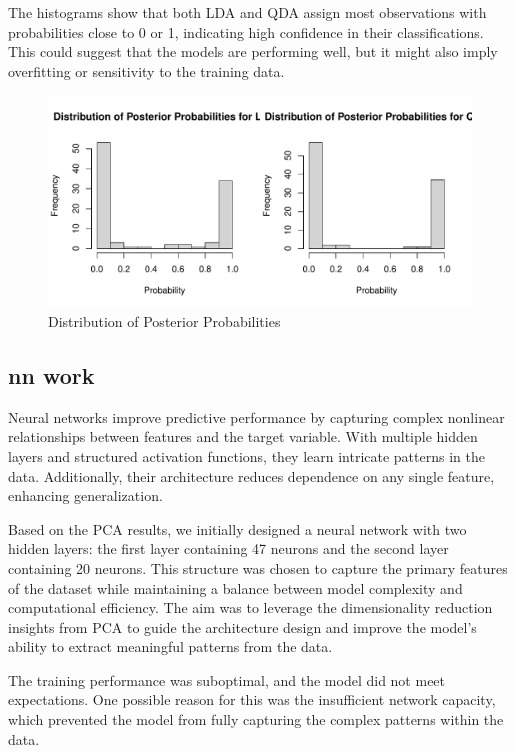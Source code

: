 \documentclass[
  12pt,
  letterpaper,
  DIV=11,
  numbers=noendperiod]{scrartcl}
\begin{document}
The histograms show that both LDA and QDA assign most observations with
probabilities close to 0 or 1, indicating high confidence in their
classifications. This could suggest that the models are performing well,
but it might also imply overfitting or sensitivity to the training data.

\begin{figure}[H]

{\centering \includegraphics{me_files/figure-pdf/Distribution of Posterior-1.pdf}

}

\caption{Distribution of Posterior Probabilities}

\end{figure}%

\subsection{nn work}\label{nn-work}

Neural networks improve predictive performance by capturing complex
nonlinear relationships between features and the target variable. With
multiple hidden layers and structured activation functions, they learn
intricate patterns in the data. Additionally, their architecture reduces
dependence on any single feature, enhancing generalization.

Based on the PCA results, we initially designed a neural network with
two hidden layers: the first layer containing 47 neurons and the second
layer containing 20 neurons. This structure was chosen to capture the
primary features of the dataset while maintaining a balance between
model complexity and computational efficiency. The aim was to leverage
the dimensionality reduction insights from PCA to guide the architecture
design and improve the model's ability to extract meaningful patterns
from the data.

The training performance was suboptimal, and the model did not meet
expectations. One possible reason for this was the insufficient network
capacity, which prevented the model from fully capturing the complex
patterns within the data.
\end{document}
